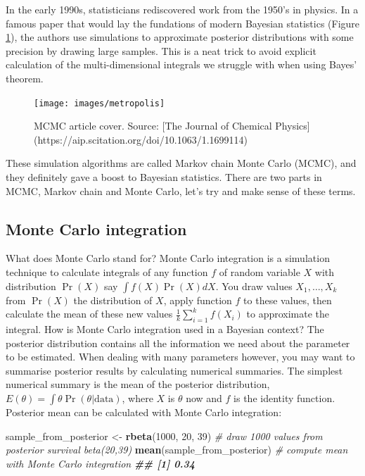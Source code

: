 \documentclass[
  12pt,
]{krantz}
\newenvironment{Shaded}{\begin{snugshade}}{\end{snugshade}}
\newcommand{\CommentTok}[1]{\textcolor[rgb]{0.56,0.35,0.01}{\textit{#1}}}
\newcommand{\DecValTok}[1]{\textcolor[rgb]{0.00,0.00,0.81}{#1}}
\newcommand{\DocumentationTok}[1]{\textcolor[rgb]{0.56,0.35,0.01}{\textbf{\textit{#1}}}}
\newcommand{\FunctionTok}[1]{\textcolor[rgb]{0.13,0.29,0.53}{\textbf{#1}}}
\newcommand{\NormalTok}[1]{#1}
\newcommand{\OtherTok}[1]{\textcolor[rgb]{0.56,0.35,0.01}{#1}}
\begin{document}
In the early 1990s, statisticians rediscovered work from the 1950's in physics. In a famous paper that would lay the fundations of modern Bayesian statistics (Figure \ref{fig:mcmcpaper}), the authors use simulations to approximate posterior distributions with some precision by drawing large samples. This is a neat trick to avoid explicit calculation of the multi-dimensional integrals we struggle with when using Bayes' theorem.

\begin{figure}

{\centering \texttt{[image: images/metropolis]} 

}

\caption{MCMC article cover. Source: [The Journal of Chemical Physics](https://aip.scitation.org/doi/10.1063/1.1699114)}\label{fig:mcmcpaper}
\end{figure}

These simulation algorithms are called Markov chain Monte Carlo (MCMC), and they definitely gave a boost to Bayesian statistics. There are two parts in MCMC, Markov chain and Monte Carlo, let's try and make sense of these terms.

\hypertarget{monte-carlo-integration}{%
\subsection{Monte Carlo integration}\label{monte-carlo-integration}}

What does Monte Carlo stand for? Monte Carlo integration is a simulation technique to calculate integrals of any function \(f\) of random variable \(X\) with distribution \(\Pr(X)\) say \(\int f(X) \Pr(X)dX\). You draw values \(X_1,\ldots,X_k\) from \(\Pr(X)\) the distribution of \(X\), apply function \(f\) to these values, then calculate the mean of these new values \(\displaystyle{\frac{1}{k}}\sum_{i=1}^k{f(X_i)}\) to approximate the integral. How is Monte Carlo integration used in a Bayesian context? The posterior distribution contains all the information we need about the parameter to be estimated. When dealing with many parameters however, you may want to summarise posterior results by calculating numerical summaries. The simplest numerical summary is the mean of the posterior distribution, \(E(\theta) = \int \theta \Pr(\theta|\text{data})\), where \(X\) is \(\theta\) now and \(f\) is the identity function. Posterior mean can be calculated with Monte Carlo integration:

\begin{Shaded}
\begin{Highlighting}[]
\NormalTok{sample\_from\_posterior }\OtherTok{\textless{}{-}} \FunctionTok{rbeta}\NormalTok{(}\DecValTok{1000}\NormalTok{, }\DecValTok{20}\NormalTok{, }\DecValTok{39}\NormalTok{) }\CommentTok{\# draw 1000 values from posterior survival beta(20,39)}
\FunctionTok{mean}\NormalTok{(sample\_from\_posterior) }\CommentTok{\# compute mean with Monte Carlo integration}
\DocumentationTok{\#\# [1] 0.34}
\end{Highlighting}
\end{Shaded}
\end{document}

